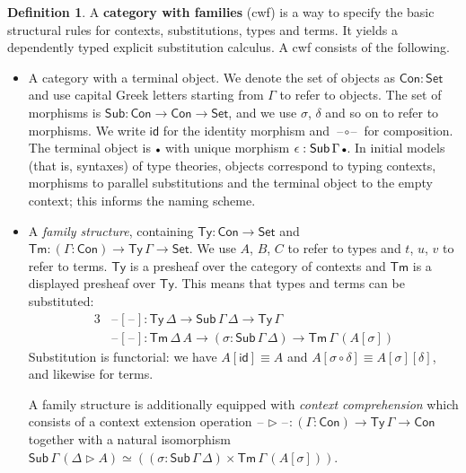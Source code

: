 \documentclass[12pt,a4paper,twoside,openany]{book}
\theoremstyle{remark}
\theoremstyle{definition}
\newtheorem{mydefinition}{Definition}
\theoremstyle{theorem}
\newcommand{\id}{\mathsf{id}}
\newcommand{\Con}{\mathsf{Con}}
\newcommand{\Sub}{\mathsf{Sub}}
\newcommand{\Tm}{\mathsf{Tm}}
\newcommand{\Ty}{\mathsf{Ty}}
\newcommand{\blank}{\mathord{\hspace{1pt}\text{--}\hspace{1pt}}}
\newcommand{\Set}{\mathsf{Set}}
\newcommand{\ext}{\triangleright}
\newcommand{\emptycon}{\scaleobj{.75}\bullet}
\begin{document}
\begin{mydefinition}
A \textbf{category with families} (cwf) \cite{Dybjer96internaltype} is a way to
specify the basic structural rules for contexts, substitutions, types and
terms. It yields a dependently typed explicit substitution calculus.  A cwf
consists of the following.
\begin{itemize}
\item
  A category with a terminal object. We denote the set of objects as $\Con :
  \Set$ and use capital Greek letters starting from $\Gamma$ to refer to
  objects. The set of morphisms is $\Sub : \Con \to \Con \to \Set$, and we use
  $\sigma$, $\delta$ and so on to refer to morphisms. We write $\id$ for the
  identity morphism and $\blank\circ\blank$ for composition. The terminal
  object is $\emptycon$ with unique morphism $\epsilon :
  \Sub\,\Gamma\,\emptycon$. In initial models (that is, syntaxes) of type
  theories, objects correspond to typing contexts, morphisms to parallel
  substitutions and the terminal object to the empty context; this informs the
  naming scheme.
\item A \emph{family structure}, containing $\Ty : \Con \to \Set$ and $\Tm :
  (\Gamma : \Con) \to \Ty\,\Gamma \to \Set$. We use $A$, $B$, $C$ to refer to
  types and $t$, $u$, $v$ to refer to terms. $\Ty$ is a presheaf over the
  category of contexts and $\Tm$ is a displayed presheaf over $\Ty$. This means
  that types and terms can be substituted:
  \begin{alignat*}{3}
    &\blank[\blank] : \Ty\,\Delta \to \Sub\,\Gamma\,\Delta \to \Ty\,\Gamma\\
    &\blank[\blank] : \Tm\,\Delta\,A \to (\sigma : \Sub\,\Gamma\,\Delta) \to \Tm\,\Gamma\,(A[\sigma])
  \end{alignat*}
  Substitution is functorial: we have $A[\id] \equiv A$ and
  $A[\sigma\circ\delta] \equiv A[\sigma][\delta]$, and likewise for terms.

  A family structure is additionally equipped with \emph{context comprehension}
  which consists of a context extension operation $\blank\ext\blank : (\Gamma :
  \Con) \to \Ty\,\Gamma \to \Con$ together with a natural isomorphism
  $\Sub\,\Gamma\,(\Delta\ext A) \simeq ((\sigma : \Sub\,\Gamma\,\Delta) \times
  \Tm\,\Gamma\,(A[\sigma]))$.
\end{itemize}
\end{mydefinition}
\end{document}
